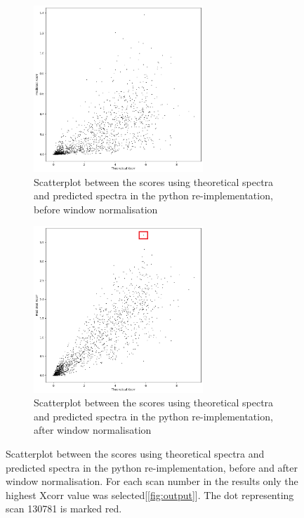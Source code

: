 \documentclass[11pt]{article}
\begin{document}
\begin{figure}
\centering
\begin{subfigure}[b]{1\textwidth}
    \centering
    \includegraphics[width=0.7\textwidth]{figs/scatterplot_predicted_theoretical.png}
   \caption{Scatterplot between the scores using theoretical spectra and predicted spectra in the python re-implementation, before window normalisation}
   \label{fig:scatterplot_predicted_theoretical} 
\end{subfigure}
\begin{subfigure}[b]{1\textwidth}
    \centering
   \includegraphics[width=0.7\textwidth]{figs/scatterplot_windows.png}
   \caption{Scatterplot between the scores using theoretical spectra and predicted spectra in the python re-implementation, after window normalisation}
   \label{fig:scatterplot_windows}
\end{subfigure}
\caption{Scatterplot between the scores using theoretical spectra and predicted spectra in the python re-implementation, before and after window normalisation. For each scan number in the results only the highest Xcorr value was selected[\cref{fig:output}]. The dot representing scan 130781 is marked red.}
\label{scatterplot_python}
\end{figure}
\end{document}
